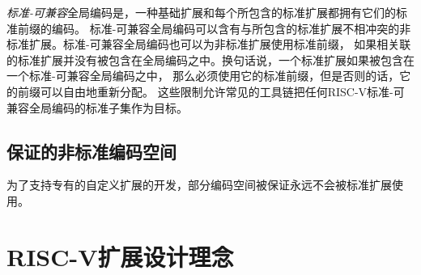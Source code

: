 {\em 标准-可兼容}全局编码是，一种基础扩展和每个所包含的标准扩展都拥有它们的标准前缀的编码。
标准-可兼容全局编码可以含有与所包含的标准扩展不相冲突的非标准扩展。标准-可兼容全局编码也可以为非标准扩展使用标准前缀，
如果相关联的标准扩展并没有被包含在全局编码之中。换句话说，一个标准扩展如果被包含在一个标准-可兼容全局编码之中，
那么必须使用它的标准前缀，但是否则的话，它的前缀可以自由地重新分配。
这些限制允许常见的工具链把任何RISC-V标准-可兼容全局编码的标准子集作为目标。

\vspace{-0.2in}
\subsection*{保证的非标准编码空间}

为了支持专有的自定义扩展的开发，部分编码空间被保证永远不会被标准扩展使用。

\section{RISC-V扩展设计理念}

